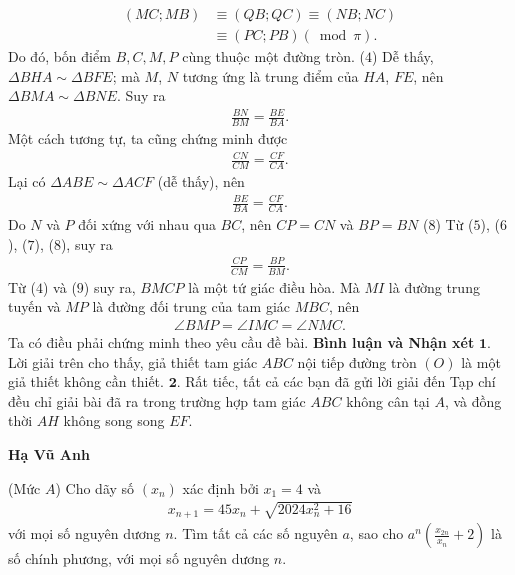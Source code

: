 \begin{multicols}{2}
\begin{align*}
		\left( {MC;MB} \right) &\equiv \left( {QB;QC} \right) \equiv \left( {NB;NC} \right) \\
		&\equiv \left( {PC;PB} \right)\left( {\bmod \pi } \right).
	\end{align*}
	Do đó, bốn điểm $B, C, M, P$ cùng thuộc một đường tròn.    \hfill ($4$)
	\vskip 0.05cm
	Dễ thấy, $\Delta BHA \sim \Delta BFE$; mà $M$, $N$ tương ứng là trung điểm của $HA$, $FE$, nên $\Delta BMA \sim \Delta BNE$. Suy ra
	\begin{align*}
		\frac{{BN}}{{BM}} = \frac{{BE}}{{BA}}. \tag{$5$}
	\end{align*}
	Một cách tương tự, ta cũng chứng minh được
	\begin{align*}
		\frac{{CN}}{{CM}} = \frac{{CF}}{{CA}}. \tag{$6$}
	\end{align*}
	Lại có $\Delta ABE \sim \Delta ACF$ (dễ thấy), nên
	\begin{align*}
		\frac{{BE}}{{BA}} = \frac{{CF}}{{CA}}. \tag{$7$}
	\end{align*}
	Do $N$ và $P$ đối xứng với nhau qua $BC$, nên $CP = CN$ và $BP = BN$ \hfill  ($8$)
	\vskip 0.05cm
	Từ ($5$), ($6$), ($7$), ($8$), suy ra
	\begin{align*}
		\frac{{CP}}{{CM}} = \frac{{BP}}{{BM}}. \tag{$9$}
	\end{align*}
	Từ ($4$) và ($9$) suy ra, $BMCP$ là một tứ giác điều hòa. Mà $MI$ là đường trung tuyến và $MP$ là đường đối trung của tam giác $MBC$, nên
	\begin{align*}
		\angle BMP = \angle IMC = \angle NMC.
	\end{align*}
	Ta có điều phải chứng minh theo yêu cầu đề bài.
	\vskip 0.05cm
	\textbf{\color{thachthuctoanhoc}Bình luận và Nhận xét}
	\vskip 0.05cm
	$\pmb{1.}$ Lời giải trên cho thấy, giả thiết tam giác $ABC$ nội tiếp đường tròn $(O)$ là một giả thiết không cần thiết.
	\vskip 0.05cm
	$\pmb{2.}$ Rất tiếc, tất cả các bạn đã gửi lời giải đến Tạp chí đều chỉ giải bài đã ra trong trường hợp tam giác $ABC$ không cân tại $A$, và đồng thời $AH$ không song song $EF$.
	\begin{flushright}
		\textbf{\color{thachthuctoanhoc}Hạ Vũ Anh}
	\end{flushright}
	{}
	(Mức $A$) Cho dãy số  $(x_n)$ xác định bởi $x_1 = 4$  và
	\begin{align*}
		{x_{n + 1}} = 45{x_n} + \sqrt {2024x_n^2 + 16} 
	\end{align*}
	với mọi số nguyên dương $n$.
	\vskip 0.05cm
	Tìm tất cả các số nguyên $a$, sao cho ${a^n}\left( {\frac{{{x_{2n}}}}{{{x_n}}} + 2} \right)$  là số chính phương, với mọi số nguyên dương $n$.

\end{multicols}

